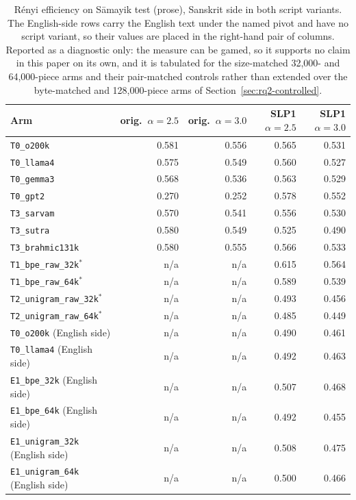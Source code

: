 \begin{table}[t]
\centering
\footnotesize
\begin{tabular}{lrrrr}
\toprule
Arm & orig.\ $\alpha=2.5$ & orig.\ $\alpha=3.0$ & SLP1 $\alpha=2.5$ & SLP1 $\alpha=3.0$ \\
\midrule
\texttt{T0\_o200k} & 0.581 & 0.556 & 0.565 & 0.531 \\
\texttt{T0\_llama4} & 0.575 & 0.549 & 0.560 & 0.527 \\
\texttt{T0\_gemma3} & 0.568 & 0.536 & 0.563 & 0.529 \\
\texttt{T0\_gpt2} & 0.270 & 0.252 & 0.578 & 0.552 \\
\texttt{T3\_sarvam} & 0.570 & 0.541 & 0.556 & 0.530 \\
\texttt{T3\_sutra} & 0.580 & 0.549 & 0.525 & 0.490 \\
\texttt{T3\_brahmic131k} & 0.580 & 0.555 & 0.566 & 0.533 \\
\texttt{T1\_bpe\_raw\_32k}$^{*}$ & n/a & n/a & 0.615 & 0.564 \\
\texttt{T1\_bpe\_raw\_64k}$^{*}$ & n/a & n/a & 0.589 & 0.539 \\
\texttt{T2\_unigram\_raw\_32k}$^{*}$ & n/a & n/a & 0.493 & 0.456 \\
\texttt{T2\_unigram\_raw\_64k}$^{*}$ & n/a & n/a & 0.485 & 0.449 \\
\texttt{T0\_o200k} (English side) & n/a & n/a & 0.490 & 0.461 \\
\texttt{T0\_llama4} (English side) & n/a & n/a & 0.492 & 0.463 \\
\texttt{E1\_bpe\_32k} (English side) & n/a & n/a & 0.507 & 0.468 \\
\texttt{E1\_bpe\_64k} (English side) & n/a & n/a & 0.492 & 0.455 \\
\texttt{E1\_unigram\_32k} (English side) & n/a & n/a & 0.508 & 0.475 \\
\texttt{E1\_unigram\_64k} (English side) & n/a & n/a & 0.500 & 0.466 \\
\bottomrule
\end{tabular}
\caption{R\'enyi efficiency on S\=amayik test (prose), Sanskrit side in both script variants. The English-side rows carry the English text under the named pivot and have no script variant, so their values are placed in the right-hand pair of columns. Reported as a diagnostic only: the measure can be gamed, so it supports no claim in this paper on its own, and it is tabulated for the size-matched 32,000- and 64,000-piece arms and their pair-matched controls rather than extended over the byte-matched and 128,000-piece arms of Section~\ref{sec:rq2-controlled}.}
\label{tab:renyi}
\end{table}
